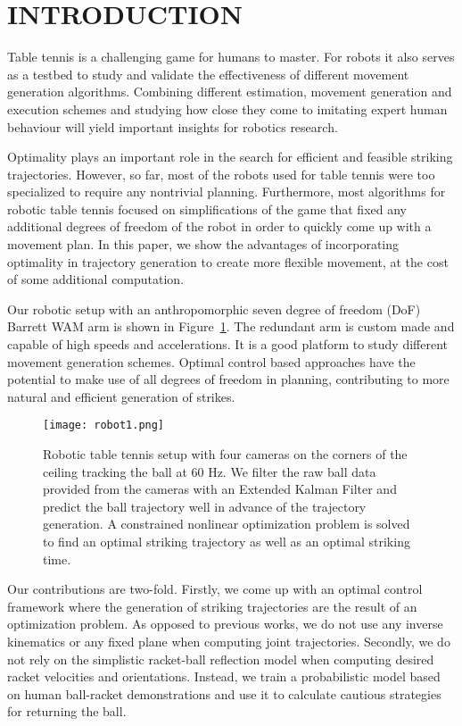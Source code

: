 \section{INTRODUCTION}

Table tennis is a challenging game for humans to master. For robots it also serves as a testbed to study and validate the effectiveness of different movement generation algorithms. Combining different estimation, movement generation and execution schemes and studying how close they come to imitating expert human behaviour will yield important insights for robotics research.

Optimality plays an important role in the search for efficient and feasible striking trajectories. However, so far, most of the robots used for table tennis were too specialized to require any nontrivial planning. Furthermore, most algorithms for robotic table tennis focused on simplifications of the game that fixed any additional degrees of freedom of the robot in order to quickly come up with a movement plan. In this paper, we show the advantages of incorporating optimality in trajectory generation to create more flexible movement, at the cost of some additional computation. 

Our robotic setup with an anthropomorphic seven degree of freedom (DoF) Barrett WAM arm is shown in Figure~\ref{robot}. The redundant arm is custom made and capable of high speeds and accelerations. It is a good platform to study different movement generation schemes. Optimal control based approaches have the potential to make use of all degrees of freedom in planning, contributing to more natural and efficient generation of strikes.

\begin{figure}[t!]
\center
\texttt{[image: robot1.png]}			
\caption{Robotic table tennis setup with four cameras on the corners of the ceiling tracking the ball at 60 Hz. We filter the raw ball data provided from the cameras with an Extended Kalman Filter and predict the ball trajectory well in advance of the trajectory generation. A constrained nonlinear optimization problem is solved to find an optimal striking trajectory as well as an optimal striking time.}
\label{robot}
\end{figure}

Our contributions are two-fold. Firstly, we come up with an optimal control framework where the generation of striking trajectories are the result of an optimization problem. As opposed to previous works, we do not use any inverse kinematics or any fixed plane when computing joint trajectories. Secondly, we do not rely on the simplistic racket-ball reflection model when computing desired racket velocities and orientations. Instead, we train a probabilistic model based on human ball-racket demonstrations and use it to calculate cautious strategies for returning the ball.

